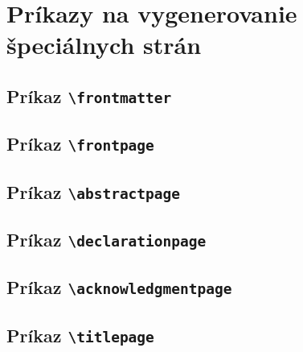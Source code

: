 \section{Príkazy na vygenerovanie špeciálnych strán}

\subsection{Príkaz {\tt \textbackslash{}frontmatter}}
\subsection{Príkaz {\tt \textbackslash{}frontpage}}
\subsection{Príkaz {\tt \textbackslash{}abstractpage}}
\subsection{Príkaz {\tt \textbackslash{}declarationpage}}
\subsection{Príkaz {\tt \textbackslash{}acknowledgmentpage}}
\subsection{Príkaz {\tt \textbackslash{}titlepage}}



